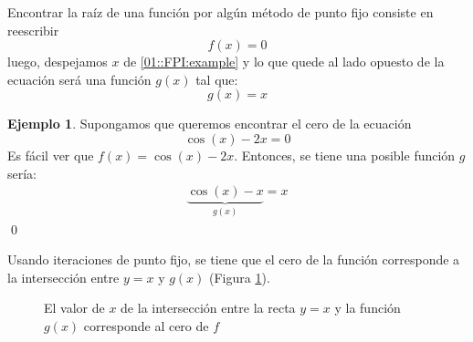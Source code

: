 \documentclass[english, spanish, fleqn, 10pt]{article}
\numberwithin{equation}{section}
\newcommand{\nparentesis}[1]{\left( #1 \right)}
\theoremstyle{definition}
\newtheorem{ejemplo}{Ejemplo}[section]
\begin{document}
Encontrar la raíz de una función por algún método de punto fijo consiste en reescribir
\begin{equation}\label{01::FPI:example}
	f\nparentesis{x}=0
\end{equation}
luego, despejamos $x$ de \eqref{01::FPI:example} y lo que quede al lado opuesto de la ecuación será una función $g\nparentesis{x}$ tal que:
\begin{equation}
g\nparentesis{x}=x
\end{equation}
\begin{ejemplo}
	Supongamos que queremos encontrar el cero de la ecuación
	\begin{equation*}
	\cos\nparentesis{x}-2x=0
	\end{equation*}
	Es fácil ver que $f\nparentesis{x}=\cos\nparentesis{x}-2x$. Entonces, se tiene una posible función $g$ sería:
	\begin{align*}
		\underbrace{\cos\nparentesis{x}-x}_{g\nparentesis{x}}=x
	\end{align*}
	\qed
\end{ejemplo}

Usando iteraciones de punto fijo, se tiene que el cero de la función corresponde a la intersección entre $y=x$ y $g\nparentesis{x}$ (Figura \ref{01::FPI}).
\begin{figure}[!h]
	\centering
	\caption{El valor de $x$ de la intersección entre la recta $y=x$ y la función $g\nparentesis{x}$ corresponde al cero de $f$}
	\label{01::FPI}
\end{figure}
\end{document}
